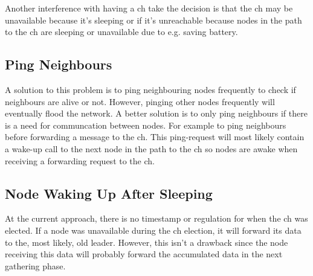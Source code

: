 \documentclass[USenglish]{uit-thesis}
\begin{document}
Another interference with having a \gls{ch} take the decision is that the \gls{ch} may be unavailable because it's sleeping or if it's unreachable because nodes in the path to the \gls{ch} are sleeping or unavailable due to e.g. saving battery. 

\subsection{Ping Neighbours}
A solution to this problem is to ping neighbouring nodes frequently to check if neighbours are alive or not. However, pinging other nodes frequently will eventually flood the network. A better solution is to only ping neighbours if there is a need for communcation between nodes. For example to ping neighbours before forwarding a message to the \gls{ch}. This ping-request will most likely contain a wake-up call to the next node in the path to the \gls{ch} so nodes are awake when receiving a forwarding request to the \gls{ch}.



\subsection{Node Waking Up After Sleeping}



At the current approach, there is no timestamp or regulation for when the \gls{ch} was elected. If a node was unavailable during the \gls{ch} election, it will forward its data to the, most likely, old leader. However, this isn't a drawback since the node receiving this data will probably forward the accumulated data in the next gathering phase.
\end{document}
